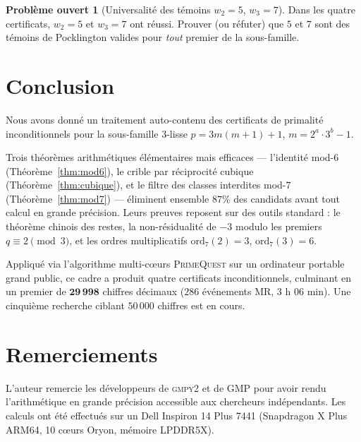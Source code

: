 \documentclass[11pt,a4paper]{article}
\theoremstyle{definition}
\newtheorem{probleme}[theoreme]{Problème ouvert}
\theoremstyle{remark}
\begin{document}
\begin{openprobbox}
\begin{probleme}[Universalité des témoins $w_2=5$, $w_3=7$]
\label{op:temoins}
Dans les quatre certificats, $w_2=5$ et $w_3=7$ ont réussi. Prouver
(ou réfuter) que $5$ et $7$ sont des témoins de Pocklington valides
pour \emph{tout} premier de la sous-famille.
\end{probleme}
\end{openprobbox}

\section{Conclusion}\label{sec:conclusion}

Nous avons donné un traitement auto-contenu des certificats de primalité
inconditionnels pour la sous-famille $3$-lisse $p=3m(m+1)+1$,
$m=2^a\cdot 3^b-1$.

Trois théorèmes arithmétiques élémentaires mais efficaces — l'identité
mod-$6$ (Théorème~\ref{thm:mod6}), le crible par réciprocité cubique
(Théorème~\ref{thm:cubique}), et le filtre des classes interdites mod-$7$
(Théorème~\ref{thm:mod7}) — éliminent ensemble $87\%$ des candidats avant
tout calcul en grande précision. Leurs preuves reposent sur des outils
standard : le théorème chinois des restes, la non-résidualité de $-3$
modulo les premiers $q\equiv 2\pmod{3}$, et les ordres multiplicatifs
$\mathrm{ord}_7(2)=3$, $\mathrm{ord}_7(3)=6$.

Appliqué via l'algorithme multi-cœurs \textsc{PrimeQuest} sur un
ordinateur portable grand public, ce cadre a produit quatre certificats
inconditionnels, culminant en un premier de $\mathbf{29\,998}$ chiffres
décimaux ($286$ événements MR, $3$ h $06$ min). Une cinquième recherche
ciblant $50\,000$ chiffres est en cours.

\section*{Remerciements}

L'auteur remercie les développeurs de \textsc{gmpy2} et de GMP pour avoir
rendu l'arithmétique en grande précision accessible aux chercheurs
indépendants. Les calculs ont été effectués sur un Dell Inspiron 14 Plus 7441
(Snapdragon X Plus ARM64, 10 cœurs Oryon, mémoire LPDDR5X).
\end{document}
